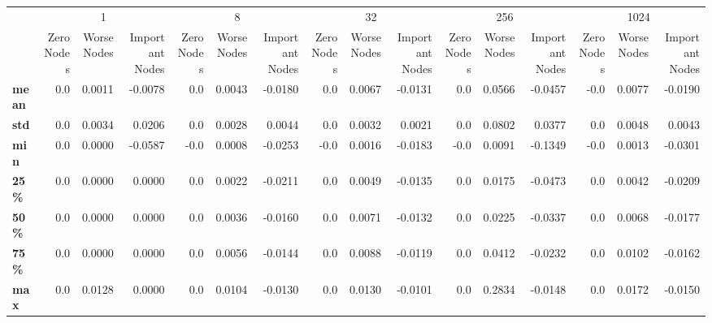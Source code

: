 \begin{tabular}{lrrrrrrrrrrrrrrr}
\toprule
{} & \multicolumn{3}{c}{1} & \multicolumn{3}{c}{8} & \multicolumn{3}{c}{32} & \multicolumn{3}{c}{256} & \multicolumn{3}{c}{1024} \\
{} & Zero Nodes & Worse Nodes & Important Nodes & Zero Nodes & Worse Nodes & Important Nodes & Zero Nodes & Worse Nodes & Important Nodes & Zero Nodes & Worse Nodes & Important Nodes & Zero Nodes & Worse Nodes & Important Nodes \\
\midrule
\textbf{mean} &        0.0 &      0.0011 &         -0.0078 &        0.0 &      0.0043 &         -0.0180 &        0.0 &      0.0067 &         -0.0131 &        0.0 &      0.0566 &         -0.0457 &       -0.0 &      0.0077 &         -0.0190 \\
\textbf{std } &        0.0 &      0.0034 &          0.0206 &        0.0 &      0.0028 &          0.0044 &        0.0 &      0.0032 &          0.0021 &        0.0 &      0.0802 &          0.0377 &        0.0 &      0.0048 &          0.0043 \\
\textbf{min } &        0.0 &      0.0000 &         -0.0587 &       -0.0 &      0.0008 &         -0.0253 &       -0.0 &      0.0016 &         -0.0183 &       -0.0 &      0.0091 &         -0.1349 &       -0.0 &      0.0013 &         -0.0301 \\
\textbf{25\% } &        0.0 &      0.0000 &          0.0000 &        0.0 &      0.0022 &         -0.0211 &        0.0 &      0.0049 &         -0.0135 &        0.0 &      0.0175 &         -0.0473 &        0.0 &      0.0042 &         -0.0209 \\
\textbf{50\% } &        0.0 &      0.0000 &          0.0000 &        0.0 &      0.0036 &         -0.0160 &        0.0 &      0.0071 &         -0.0132 &        0.0 &      0.0225 &         -0.0337 &        0.0 &      0.0068 &         -0.0177 \\
\textbf{75\% } &        0.0 &      0.0000 &          0.0000 &        0.0 &      0.0056 &         -0.0144 &        0.0 &      0.0088 &         -0.0119 &        0.0 &      0.0412 &         -0.0232 &        0.0 &      0.0102 &         -0.0162 \\
\textbf{max } &        0.0 &      0.0128 &          0.0000 &        0.0 &      0.0104 &         -0.0130 &        0.0 &      0.0130 &         -0.0101 &        0.0 &      0.2834 &         -0.0148 &        0.0 &      0.0172 &         -0.0150 \\
\bottomrule
\end{tabular}
